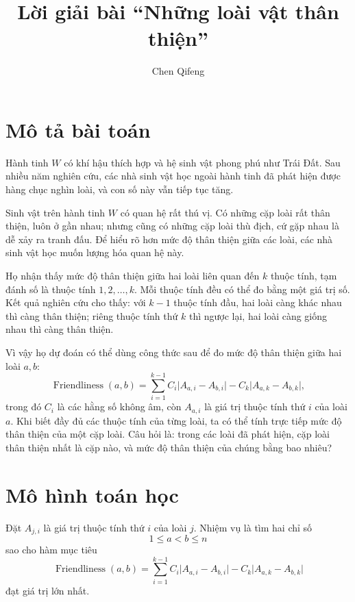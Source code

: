 \documentclass[11pt]{article}
\title{Lời giải bài ``Những loài vật thân thiện''}
\author{Chen Qifeng}
\date{}
\begin{document}
\maketitle


\section{Mô tả bài toán}

Hành tinh \(W\) có khí hậu thích hợp và hệ sinh vật phong phú như Trái Đất.
Sau nhiều năm nghiên cứu, các nhà sinh vật học ngoài hành tinh đã phát hiện
được hàng chục nghìn loài, và con số này vẫn tiếp tục tăng.

Sinh vật trên hành tinh \(W\) có quan hệ rất thú vị. Có những cặp loài rất
thân thiện, luôn ở gần nhau; nhưng cũng có những cặp loài thù địch, cứ gặp
nhau là dễ xảy ra tranh đấu. Để hiểu rõ hơn mức độ thân thiện giữa các loài,
các nhà sinh vật học muốn lượng hóa quan hệ này.

Họ nhận thấy mức độ thân thiện giữa hai loài liên quan đến \(k\) thuộc tính,
tạm đánh số là thuộc tính \(1,2,\ldots,k\). Mỗi thuộc tính đều có thể đo bằng
một giá trị số. Kết quả nghiên cứu cho thấy: với \(k-1\) thuộc tính đầu, hai
loài càng khác nhau thì càng thân thiện; riêng thuộc tính thứ \(k\) thì ngược
lại, hai loài càng giống nhau thì càng thân thiện.

Vì vậy họ dự đoán có thể dùng công thức sau để đo mức độ thân thiện giữa hai
loài \(a,b\):
\[
  \operatorname{Friendliness}(a,b)=
  \sum_{i=1}^{k-1} C_i\lvert A_{a,i}-A_{b,i}\rvert
  - C_k\lvert A_{a,k}-A_{b,k}\rvert,
\]
trong đó \(C_i\) là các hằng số không âm, còn \(A_{a,i}\) là giá trị thuộc
tính thứ \(i\) của loài \(a\). Khi biết đầy đủ các thuộc tính của từng loài,
ta có thể tính trực tiếp mức độ thân thiện của một cặp loài. Câu hỏi là: trong
các loài đã phát hiện, cặp loài thân thiện nhất là cặp nào, và mức độ thân
thiện của chúng bằng bao nhiêu?

\section{Mô hình toán học}

Đặt \(A_{j,i}\) là giá trị thuộc tính thứ \(i\) của loài \(j\). Nhiệm vụ là
tìm hai chỉ số
\[
  1\le a<b\le n
\]
sao cho hàm mục tiêu
\begin{equation}
  \operatorname{Friendliness}(a,b)=
  \sum_{i=1}^{k-1} C_i\lvert A_{a,i}-A_{b,i}\rvert
  - C_k\lvert A_{a,k}-A_{b,k}\rvert
\label{eq:friendliness}
\end{equation}
đạt giá trị lớn nhất.
\end{document}
